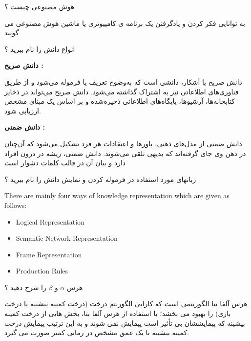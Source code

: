 \documentclass[12pt]{article}
\begin{document}

\noindent
هوش مصنوعی چیست ؟

\begin{tcolorbox}
به توانایی فکر کردن و یادگرفتن یک برنامه ی کامپیوتری یا ماشین  هوش مصنوعی می گویند 
\end{tcolorbox}


\vspace{30pt}

\noindent
انواع دانش را نام ببرید ؟

\begin{tcolorbox}
\textbf{  دانش صریح : }


دانش صریح یا آشکار، دانشی است که به‌وضوح تعریف یا فرموله می‌شود و از طریق فناوری‌های اطلاعاتی نیز به اشتراک گذاشته می‌شود. دانش صریح می‌تواند در ذخایر کتابخانه‌ها، آرشیوها، پایگاه‌های اطلاعاتی ذخیره‌شده و بر اساس یک مبنای مشخص ارزیابی شود.

\textbf{دانش ضمنی : }

دانش ضمنی از مدل‌های ذهنی، باورها و اعتقادات هر فرد تشکیل می‌شود که آن‌چنان در ذهن وی جای گرفته‌اند که بدیهی تلقی می‌شوند. دانش ضمنی، ریشه در درون افراد دارد و بیان آن در قالب کلمات دشوار است
\end{tcolorbox}


\vspace{30pt}

\noindent
زبانهای مورد استفاده در فرموله کردن و نمایش دانش را نام ببرید ؟
\begin{latin}
\begin{tcolorbox}
There are mainly four ways of knowledge representation which are given as follows: 
\begin{itemize}
	\item Logical Representation
	\item Semantic Network Representation
	\item Frame Representation
	\item Production Rules
\end{itemize}
\end{tcolorbox}
\end{latin}

\vspace{30pt}


\noindent
هرس
\textbf{$\alpha$}
و
\textbf{$\beta$}
را شرح دهید ؟

\begin{tcolorbox}
هرس آلفا بتا 
 الگوریتمی است که کارایی الگوریتم درخت
  (درخت کمینه بیشینه یا درخت بازی) را بهبود می بخشد؛ با استفاده از هرس آلفا بتا، بخش هایی از درخت کمینه بیشینه که پیمایششان بی تأثیر است پیمایش نمی شوند و به این ترتیب پیمایش درخت کمینه بیشینه تا یک عمق مشخص در زمانی کمتر صورت می گیرد.
\end{tcolorbox}
\end{document}
